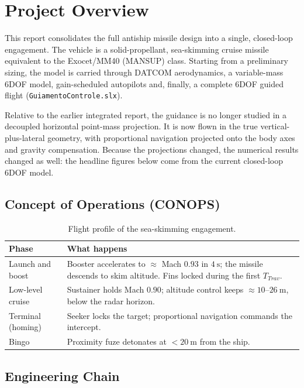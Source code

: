 \section{Project Overview}

This report consolidates the full antiship missile design into a single, closed-loop engagement. The vehicle is a solid-propellant, sea-skimming cruise missile equivalent to the Exocet/MM40 (MANSUP) class. Starting from a preliminary sizing, the model is carried through DATCOM aerodynamics, a variable-mass 6DOF model, gain-scheduled autopilots and, finally, a complete 6DOF guided flight (\texttt{GuiamentoControle.slx}).

Relative to the earlier integrated report, the guidance is no longer studied in a decoupled horizontal point-mass projection. It is now flown in the true vertical-plus-lateral geometry, with proportional navigation projected onto the body axes and gravity compensation. Because the projections changed, the numerical results changed as well: the headline figures below come from the current closed-loop 6DOF model.

\subsection{Concept of Operations (CONOPS)}

\begin{table}[H]
\centering
\caption{Flight profile of the sea-skimming engagement.}
\begin{tabular}{p{}p{}}
\toprule
Phase & What happens \\
\midrule
Launch and boost & Booster accelerates to $\approx$ Mach $0.93$ in $4~\text{s}$; the missile descends to skim altitude. Fins locked during the first $T_{Trav}$. \\
Low-level cruise & Sustainer holds Mach $0.90$; altitude control keeps $\approx 10$--$26~\text{m}$, below the radar horizon. \\
Terminal (homing) & Seeker locks the target; proportional navigation commands the intercept. \\
Bingo & Proximity fuze detonates at $<20~\text{m}$ from the ship. \\
\bottomrule
\end{tabular}
\end{table}

\subsection{Engineering Chain}

